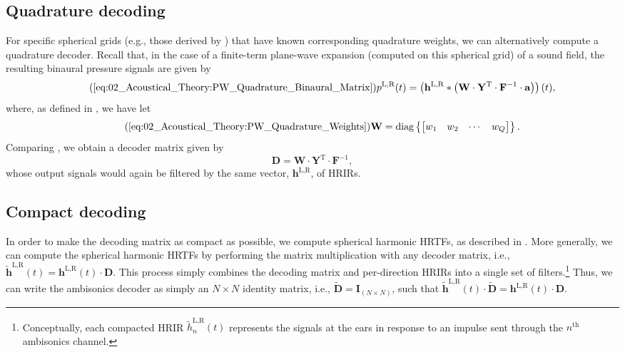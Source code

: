 \subsection{Quadrature decoding}
For specific spherical grids (e.g., those derived by \citet{FliegeMaier1999}) that have known corresponding quadrature weights,
we can alternatively compute a quadrature decoder.
Recall that, in the case of a finite-term plane-wave expansion (computed on this spherical grid) of a sound field, the resulting binaural pressure signals are given by
\begin{equation}\tag{\ref{eq:02_Acoustical_Theory:PW_Quadrature_Binaural_Matrix}}
p^{\text{L,R}}(t) = \left( \mathbf{h}^{\text{L,R}} \ast \left( \mathbf{W} \cdot \mathbf{Y}^{\textrm{T}} \cdot \mathbf{F}^{-1} \cdot \mathbf{a} \right) \right) (t),
\end{equation}
where, as defined in , we have let
\begin{equation}\tag{\ref{eq:02_Acoustical_Theory:PW_Quadrature_Weights}}
\mathbf{W} = \text{diag} \left\{ \begin{bmatrix} w_1 & w_2 & \cdots & w_Q \end{bmatrix} \right\}.
\end{equation}
Comparing , we obtain a decoder matrix given by
\begin{equation}
\mathbf{D} = \mathbf{W} \cdot \mathbf{Y}^{\textrm{T}} \cdot \mathbf{F}^{-1},
\end{equation}
whose output signals would again be filtered by the same vector, $\mathbf{h}^{\text{L,R}}$, of HRIRs.

\subsection{Compact decoding}
In order to make the decoding matrix as compact as possible, we compute spherical harmonic HRTFs, as described in .
More generally, we can compute the spherical harmonic HRTFs by performing the matrix multiplication with any decoder matrix, i.e., $\mathbf{\tilde{h}}^{\text{L,R}}(t) = \mathbf{h}^{\text{L,R}}(t) \cdot \mathbf{D}$.
This process simply combines the decoding matrix and per-direction HRIRs into a single set of filters.\footnote{Conceptually,
each compacted HRIR $\tilde{h}_{n}^{\text{L,R}}(t)$ represents the signals at the ears in response to an impulse sent through the $n^{\textrm{th}}$ ambisonics channel.}
Thus, we can write the ambisonics decoder as simply an $N \times N$ identity matrix, i.e., $\mathbf{\tilde{D}} = \mathbf{I}_{(N \times N)}$, such that $\mathbf{\tilde{h}}^{\text{L,R}}(t) \cdot \mathbf{\tilde{D}} = \mathbf{h}^{\text{L,R}}(t) \cdot \mathbf{D}$.

